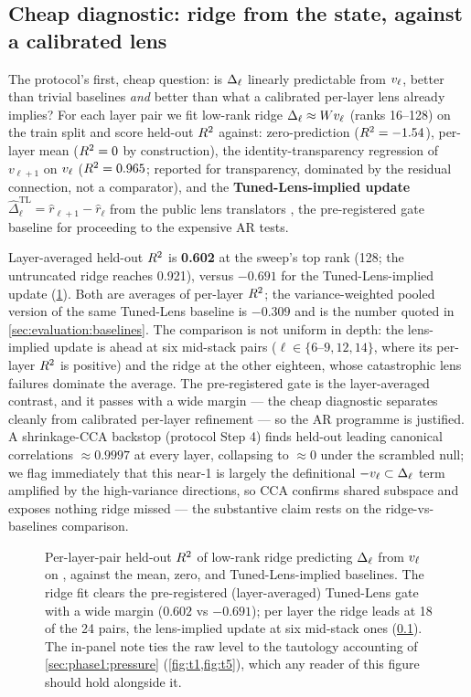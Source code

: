 \subsection{Cheap diagnostic: ridge from the state, against a calibrated lens}
\label{sec:phase1:ridge}

The protocol's first, cheap question: is $\Delta_\ell$ linearly predictable from
$v_\ell$, better than trivial baselines \emph{and} better than what a calibrated
per-layer lens already implies? For each layer pair we fit low-rank ridge
$\Delta_\ell \approx Wv_\ell$ (ranks 16--128) on the train split and score held-out
$R^2$ against: zero-prediction ($R^2=-1.54$), per-layer mean ($R^2=0$ by
construction), the identity-transparency regression of $v_{\ell+1}$ on $v_\ell$
($R^2=0.965$; reported for transparency, dominated by the residual
connection, not a comparator), and the \textbf{Tuned-Lens-implied update}
$\hat\Delta^{\mathrm{TL}}_\ell = \hat r_{\ell+1} - \hat r_\ell$ from the
public lens translators \citep{belrose2023tuned}, the pre-registered gate
baseline for proceeding to the expensive AR tests.

Layer-averaged held-out $R^2$ is \textbf{0.602} at the sweep's top rank (128;
the untruncated ridge reaches 0.921), versus \textbf{$-0.691$} for the
Tuned-Lens-implied update
(\cref{fig:h1-ridge}). Both are averages of per-layer $R^2$; the
variance-weighted pooled version of the same Tuned-Lens baseline is $-0.309$
and is the number quoted in \cref{sec:evaluation:baselines}. The comparison
is not uniform in depth: the lens-implied update is ahead at six mid-stack
pairs ($\ell \in \{6$--$9, 12, 14\}$, where its per-layer $R^2$ is positive)
and the ridge at the other eighteen, whose catastrophic lens failures
dominate the average. The pre-registered gate is the layer-averaged
contrast, and it passes
with a wide margin --- the cheap
diagnostic separates cleanly from calibrated per-layer refinement --- so the
AR programme is justified. A shrinkage-CCA backstop (protocol Step 4) finds
held-out leading canonical correlations $\approx 0.9997$ at every layer,
collapsing to $\approx 0$ under the scrambled null; we flag immediately that
this near-1 is largely the definitional $-v_\ell \subset \Delta_\ell$ term amplified by
the high-variance directions, so CCA confirms shared subspace and exposes
nothing ridge missed --- the substantive claim rests on the ridge-vs-baselines
comparison.

\begin{figure}[t]
  \centering
  
  \caption{Per-layer-pair held-out $R^2$ of low-rank ridge predicting $\Delta_\ell$
  from $v_\ell$ on \pythia{}, against the mean, zero, and Tuned-Lens-implied
  baselines. The ridge fit clears the pre-registered (layer-averaged)
  Tuned-Lens gate with a wide margin ($0.602$ vs $-0.691$); per layer the
  ridge leads at 18 of the 24 pairs, the lens-implied update at six mid-stack
  ones (\cref{sec:phase1:ridge}). The in-panel note ties the raw
  level to the tautology accounting of \cref{sec:phase1:pressure}
  (\cref{fig:t1,fig:t5}), which any reader of this figure should hold
  alongside it.}
  \label{fig:h1-ridge}
\end{figure}


